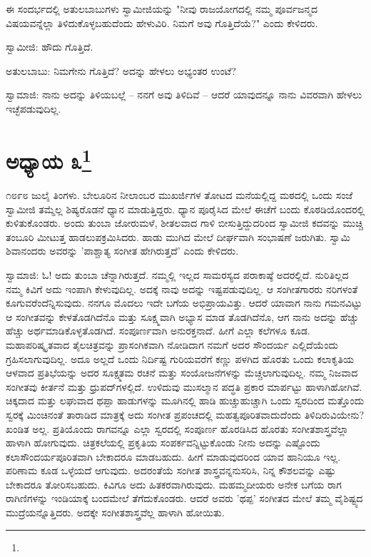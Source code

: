 ಈ ಸಂದರ್ಭದಲ್ಲಿ ಅತುಲಬಾಬುಗಳು ಸ್ವಾಮೀಜಿಯನ್ನು "ನೀವು ರಾಜಯೋಗದಲ್ಲಿ ನಮ್ಮ ಪೂರ್ವಜನ್ಮದ ವಿಷಯವನ್ನೆಲ್ಲಾ ತಿಳಿದುಕೊಳ್ಳಬಹುದೆಂದು ಹೇಳುವಿರಿ. ನಿಮಗೆ ಅವು ಗೊತ್ತಿದೆಯೆ?" ಎಂದು ಕೇಳಿದರು.

ಸ್ವಾಮೀಜಿ: ಹೌದು ಗೊತ್ತಿದೆ.

ಅತುಲಬಾಬು: ನಿಮಗೇನು ಗೊತ್ತಿದೆ? ಅದನ್ನು ಹೇಳಲು ಅಭ್ಯಂತರ ಉಂಟೆ?

ಸ್ವಾಮಾಜಿ: ನಾನು ಅದನ್ನು ತಿಳಿಯಬಲ್ಲೆ – ನನಗೆ ಅವು ತಿಳಿದಿವೆ – ಆದರೆ ಯಾವುದನ್ನೂ ನಾನು ವಿವರವಾಗಿ ಹೇಳಲು ಇಚ್ಛೆಪಡುವುದಿಲ್ಲ.

\chapter{ಅಧ್ಯಾಯ ೩\protect\footnote{}}

೧೮೯೮ ಜುಲೈ ತಿಂಗಳು. ಬೇಲೂರಿನ ನೀಲಾಂಬರ ಮುಖರ್ಜಿಗಳ ತೋಟದ ಮನೆಯಲ್ಲಿದ್ದ ಮಠದಲ್ಲಿ ಒಂದು ಸಂಜೆ ಸ್ವಾಮೀಜಿ ತಮ್ಮೆಲ್ಲ ಶಿಷ್ಯರೊಡನೆ ಧ್ಯಾನ ಮಾಡುತ್ತಿದ್ದರು. ಧ್ಯಾನ ಪೂರೈಸಿದ ಮೇಲೆ ಈಚೆಗೆ ಬಂದು ಕೊಠಡಿಯೊಂದರಲ್ಲಿ ಕುಳಿತುಕೊಂಡರು. ಅಂದು ತುಂಬಾ ಜೋರುಮಳೆ, ಶೀತಲವಾದ ಗಾಳಿ ಬೀಸುತ್ತಿದ್ದುದರಿಂದ ಸ್ವಾಮೀಜಿ ಕದವನ್ನು ಮುಚ್ಚಿ ತಂಬೂರಿ ಮೀಟುತ್ತ ಹಾಡಲುಪಕ್ರಮಿಸಿದರು. ಹಾಡು ಮುಗಿದ ಮೇಲೆ ದೀರ್ಘವಾಗಿ ಸಂಭಾಷಣೆ ಜರುಗಿತು. ಸ್ವಾಮಿ ಶಿವಾನಂದರು ಅವರನ್ನು 'ಪಾಶ್ಚಾತ್ಯ ಸಂಗೀತ ಹೇಗಿರುತ್ತದೆ' ಎಂದು ಕೇಳಿದರು.

ಸ್ವಾಮಾಜಿ: ಓ! ಅದು ತುಂಬಾ ಚೆನ್ನಾಗಿರುತ್ತದೆ. ನಮ್ಮಲ್ಲಿ ಇಲ್ಲದ ಸಾಮರಸ್ಯದ ಪರಾಕಾಷ್ಠೆ ಅದರಲ್ಲಿದೆ. ನುರಿತಿಲ್ಲದ ನಮ್ಮ ಕಿವಿಗೆ ಅದು ಇಂಪಾಗಿ ಕೇಳುವುದಿಲ್ಲ. ಅದಕ್ಕೆ ನಾವು ಅದನ್ನು ಇಷ್ಟಪಡುವುದಿಲ್ಲ. ಆ ಸಂಗೀತಗಾರರು ನರಿಗಳಂತೆ ಕೂಗುವರೆಂದೆನ್ನಿಸುವುದು. ನನಗೂ ಮೊದಲು ಇದೇ ಬಗೆಯ ಅಭಿಪ್ರಾಯವಿತ್ತು. ಆದರೆ ಯಾವಾಗ ನಾನು ಗಮನವಿಟ್ಟು ಆ ಸಂಗೀತವನ್ನು ಕೇಳತೊಡಗಿದೆನೊ ಮತ್ತು ಸೂಕ್ಷ್ಮವಾಗಿ ಅಭ್ಯಾಸ ಮಾಡ ತೊಡಗಿದೆನೊ, ಆಗ ನಾನು ಅದನ್ನು ಹೆಚ್ಚು ಹೆಚ್ಚು ಅರ್ಥಮಾಡಿಕೊಳ್ಳತೊಡಗಿದೆ. ಸಂಪೂರ್ಣವಾಗಿ ಅನುರಕ್ತನಾದೆ. ಹೀಗೆ ಎಲ್ಲಾ ಕಲೆಗಳೂ ಕೂಡ. ಮಹಾಪರಿಷ್ಕೃತವಾದ ತೈಲಚಿತ್ರವನ್ನು ಪ್ರಾಸಂಗಿಕವಾಗಿ ನೋಡಿದಾಗ ನಮಗೆ ಅದರ ಸೌಂದರ್ಯ ಎಲ್ಲಿದೆಯೆಂದು ಗ್ರಹಿಸಲಾಗುವುದಿಲ್ಲ. ಅದೂ ಅಲ್ಲದೆ ಒಂದು ನಿರ್ದಿಷ್ಟ ಗುರಿಯವರೆಗೆ ಕಣ್ಣು ಪಳಗಿದ ಹೊರತು ಒಂದು ಕಲಾಕೃತಿಯ ಆಳವಾದ ಪ್ರತಿಭೆಯನ್ನು ಅದರ ಸೂಕ್ಷ್ಮತಮ ರಚನೆ ಮತ್ತು ಸಂಯೋಜನೆಗಳನ್ನು ಮೆಚ್ಚಲಾಗುವುದಿಲ್ಲ. ನಮ್ಮ ನಿಜವಾದ ಸಂಗೀತವು ಕೀರ್ತನೆ ಮತ್ತು ಧ್ರುಪದ್‌ಗಳಲ್ಲಿದೆ. ಉಳಿದುವು ಮುಸಲ್ಮಾನ ಪದ್ಧತಿ ಪ್ರಕಾರ ಮಾರ್ಪಟ್ಟು ಹಾಳಾಗಿಹೋಗಿವೆ. ಚಿಕ್ಕದಾದ ಮತ್ತು ಲಘುವಾದ ಥಪ್ಪಾ ಹಾಡುಗಳನ್ನು ಮೂಗಿನಲ್ಲಿ ಹಾಡಿ ಹುಚ್ಚುಹುಚ್ಚಾಗಿ ಒಂದು ಸ್ವರದಿಂದ ಮತ್ತೊಂದು ಸ್ವರಕ್ಕೆ ಮಿಂಚಿನಂತೆ ತಾರಾಡಿದ ಮಾತ್ರಕ್ಕೆ ಅದು ಸಂಗೀತ ಪ್ರಪಂಚದಲ್ಲಿ ಮಹತ್ವಪೂರಿತವಾದುದೆಂದು ತಿಳಿದಿರುವಿಯೇನು? ಖಂಡಿತ ಅಲ್ಲ. ಪ್ರತಿಯೊಂದು ರಾಗವನ್ನೂ ಎಲ್ಲಾ ಸ್ವರದಲ್ಲಿ ಸಂಪೂರ್ಣ ಹೊರಡಿಸಿದ ಹೊರತು ಸಂಗೀತಶಾಸ್ತ್ರವೆಲ್ಲಾ ಹಾಳಾಗಿ ಹೋಗುವುದು. ಚಿತ್ರಕಲೆಯಲ್ಲಿ ಪ್ರಕೃತಿಯ ಸಂಪರ್ಕವನ್ನಿಟ್ಟುಕೊಂಡು ನೀನು ಅದನ್ನು ಎಷ್ಟೊಂದು ಕಲಾಸೌಂದರ್ಯಪೂರಿತವಾಗಿ ಬೇಕಾದರೂ ಮಾಡಬಹುದು. ಹೀಗೆ ಮಾಡುವುದರಿಂದ ಯಾವ ಹಾನಿಯೂ ಇಲ್ಲ. ಪರಿಣಾಮ ಕೂಡ ಒಳ್ಳೆಯದೆ ಆಗುವುದು. ಅದರಂತೆಯೆ ಸಂಗೀತ ಶಾಸ್ತ್ರವನ್ನನುಸರಿಸಿ, ನಿನ್ನ ಕೌಶಲವನ್ನು ಎಷ್ಟು ಬೇಕಾದರೂ ತೋರಿಸಬಹುದು. ಕಿವಿಗೂ ಅದು ಹಿತಕರವಾಗಿರುವುದು. ಮಹಮ್ಮದೀಯರು ಅನೇಕ ಬಗೆಯ ರಾಗ ರಾಗಿಣಿಗಳನ್ನು ಇಂಡಿಯಾಕ್ಕೆ ಬಂದಮೇಲೆ ತೆಗೆದುಕೊಂಡರು. ಆದರೆ ಅವರು 'ಥಪ್ಪ' ಸಂಗೀತದ ಮೇಲೆ ತಮ್ಮ ವೈಶಿಷ್ಟ್ಯದ ಮುದ್ರೆಯನ್ನೊತ್ತಿದರು. ಅದಕ್ಕೇ ಸಂಗೀತಶಾಸ್ತ್ರವೆಲ್ಲ ಹಾಳಾಗಿ ಹೋಯಿತು.

